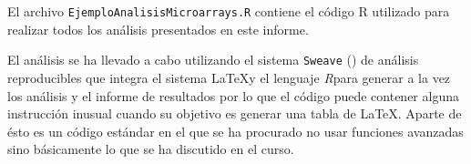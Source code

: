 \documentclass[a4paper]{article}\usepackage[]{graphicx}\usepackage[]{color}
\newcommand{\R}{{\it R}}
\begin{document}




El archivo \texttt{EjemploAnalisisMicroarrays.R} contiene el código R utilizado para realizar todos los análisis presentados en este informe.

El análisis se ha llevado a cabo utilizando el sistema \texttt{Sweave} (\cite{Leisch:2002a, Leisch:2002b}) de análisis reproducibles que integra el sistema \LaTeX y el lenguaje \R para generar a la vez los análisis y el informe de resultados por lo que el código puede contener alguna instrucción inusual cuando su objetivo es generar una tabla de \LaTeX. Aparte de ésto es un código estándar en el que se ha procurado no usar funciones avanzadas sino básicamente lo que se ha discutido en el curso.
\end{document}
